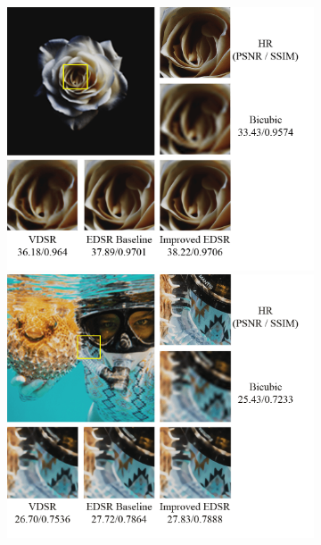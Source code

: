 \documentclass[10pt,twocolumn,letterpaper]{article}
\begin{document}
\begin{figure}[ht!]
\centering
\begin{subfigure}[t]{0.4\textwidth}
    \includegraphics[width=\textwidth]{Images/Samples/1-2.png}\\
    \includegraphics[width=\textwidth]{Images/Samples/1-1.png}\\

\end{subfigure}
\end{figure}
\end{document}
